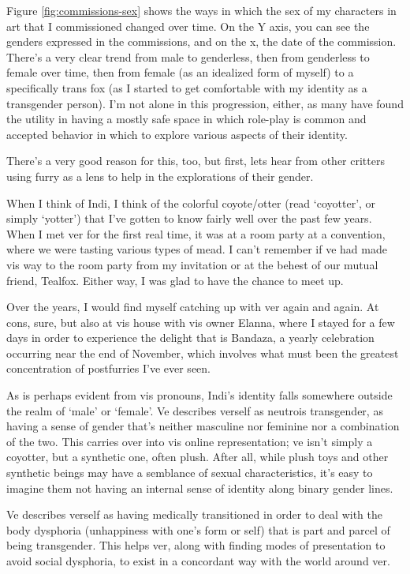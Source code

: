 Figure \ref{fig:commissions-sex} shows the ways in which the sex of my characters in art that I commissioned changed over time. On the Y axis, you can see the genders expressed in the commissions, and on the x, the date of the commission. There's a very clear trend from male to genderless, then from genderless to female over time, then from female (as an idealized form of myself) to a specifically trans fox (as I started to get comfortable with my identity as a transgender person). I'm not alone in this progression, either, as many have found the utility in having a mostly safe space in which role-play is common and accepted behavior in which to explore various aspects of their identity.

There's a very good reason for this, too, but first, lets hear from other critters using furry as a lens to help in the explorations of their gender.

\secdiv

When I think of Indi, I think of the colorful coyote/otter (read `coyotter', or simply `yotter') that I've gotten to know fairly well over the past few years. When I met ver for the first real time, it was at a room party at a convention, where we were tasting various types of mead. I can't remember if ve had made vis way to the room party from my invitation or at the behest of our mutual friend, Tealfox. Either way, I was glad to have the chance to meet up.

Over the years, I would find myself catching up with ver again and again. At cons, sure, but also at vis house with vis owner Elanna, where I stayed for a few days in order to experience the delight that is Bandaza, a yearly celebration occurring near the end of November, which involves what must been the greatest concentration of postfurries I've ever seen.

As is perhaps evident from vis pronouns, Indi's identity falls somewhere outside the realm of `male' or `female'. Ve describes verself as neutrois transgender, as having a sense of gender that's neither masculine nor feminine nor a combination of the two. This carries over into vis online representation; ve isn't simply a coyotter, but a synthetic one, often plush. After all, while plush toys and other synthetic beings may have a semblance of sexual characteristics, it's easy to imagine them not having an internal sense of identity along binary gender lines.

Ve describes verself as having medically transitioned in order to deal with the body dysphoria (unhappiness with one's form or self) that is part and parcel of being transgender. This helps ver, along with finding modes of presentation to avoid social dysphoria, to exist in a concordant way with the world around ver.

